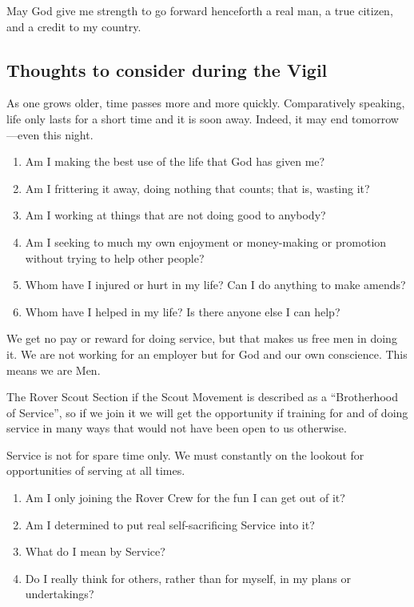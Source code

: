 \documentclass[11pt]{article}
\begin{document}
May God give me strength to go forward henceforth a real man, a true citizen, and a credit to my country.

\subsection{Thoughts to consider during the Vigil}
As one grows older, time passes more and more quickly. Comparatively speaking, life only lasts for a short time and it is soon away. Indeed, it may end tomorrow---even this night.

\begin{enumerate}
  \item Am I making the best use of the life that God has given me?
  \item Am I frittering it away, doing nothing that counts; that is, wasting it?
  \item Am I working at things that are not doing good to anybody?
  \item Am I seeking to much my own enjoyment or money-making or promotion without trying to help other people?
  \item Whom have I injured or hurt in my life? Can I do anything to make amends?
  \item Whom have I helped in my life? Is there anyone else I can help?
\end{enumerate}

We get no pay or reward for doing service, but that makes us free men in doing it. We are not working for an employer but for God and our own conscience. This means we are Men.

The Rover Scout Section if the Scout Movement is described as a ``Brotherhood of Service'', so if we join it we will get the opportunity if training for and of doing service in many ways that would not have been open to us otherwise.

Service is not for spare time only. We must constantly on the lookout for opportunities of serving at all times.

\begin{enumerate}
  \item Am I only joining the Rover Crew for the fun I can get out of it?
  \item Am I determined to put real self-sacrificing Service into it?
  \item What do I mean by Service?
  \item Do I really think for others, rather than for myself, in my plans or undertakings?
\end{enumerate}
 
\end{document}
